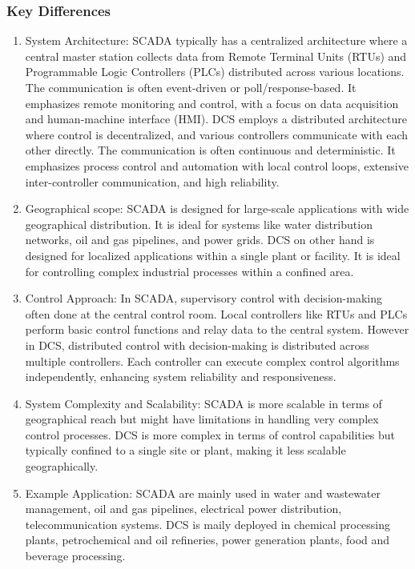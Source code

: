 \subsubsection{Key Differences}
\begin{enumerate}
    \item System Architecture: SCADA typically has a centralized architecture where a central master station collects data from Remote Terminal Units (RTUs) and Programmable Logic Controllers (PLCs) distributed across various locations. The communication is often event-driven or poll/response-based. It emphasizes remote monitoring and control, with a focus on data acquisition and human-machine interface (HMI). DCS employs a distributed architecture where control is decentralized, and various controllers communicate with each other directly. The communication is often continuous and deterministic. It emphasizes process control and automation with local control loops, extensive inter-controller communication, and high reliability.

    \item Geographical scope: SCADA is designed for large-scale applications with wide geographical distribution. It is ideal for systems like water distribution networks, oil and gas pipelines, and power grids. DCS on other hand is designed for localized applications within a single plant or facility. It is ideal for controlling complex industrial processes within a confined area.
    
    \item Control Approach: In SCADA, supervisory control with decision-making often done at the central control room. Local controllers like RTUs and PLCs perform basic control functions and relay data to the central system. However in DCS,  distributed control with decision-making is distributed across multiple controllers. Each controller can execute complex control algorithms independently, enhancing system reliability and responsiveness.
    
    \item System Complexity and Scalability: SCADA is more scalable in terms of geographical reach but might have limitations in handling very complex control processes. DCS is more complex in terms of control capabilities but typically confined to a single site or plant, making it less scalable geographically.

    \item Example Application: SCADA are mainly used in water and wastewater management, oil and gas pipelines, electrical power distribution, telecommunication systems. DCS is maily deployed in chemical processing plants, petrochemical and oil refineries, power generation plants, food and beverage processing.
\end{enumerate}

